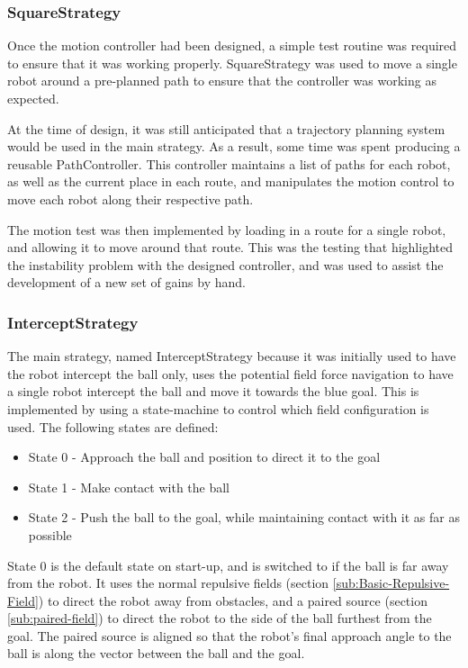 \documentclass[10pt]{article}
\begin{document}
\subsubsection{SquareStrategy}

Once the motion controller had been designed, a simple test routine was required
to ensure that it was working properly.  SquareStrategy was used to move a
single robot around a pre-planned path to ensure that the controller was working
as expected.

At the time of design, it was still anticipated that a trajectory planning
system would be used in the main strategy.  As a result, some time was spent
producing a reusable PathController.  This controller maintains a list of paths
for each robot, as well as the current place in each route, and manipulates the
motion control to move each robot along their respective path.

The motion test was then implemented by loading in a route for a single robot,
and allowing it to move around that route.  This was the testing that
highlighted the instability problem with the designed controller, and was used
to assist the development of a new set of gains by hand.

\subsubsection{InterceptStrategy}

The main strategy, named InterceptStrategy because it was initially used to have
the robot intercept the ball only, uses the potential field force navigation to
have a single robot intercept the ball and move it towards the blue goal.  This
is implemented by using a state-machine to control which field configuration is
used.  The following states are defined:

\begin{itemize}
  \item State 0 - Approach the ball and position to direct it to the goal
  \item State 1 - Make contact with the ball
  \item State 2 - Push the ball to the goal, while maintaining contact with it
  as far as possible
\end{itemize}

State 0 is the default state on start-up, and is switched to if the ball is far
away from the robot.  It uses the normal repulsive fields (section
\ref{sub:Basic-Repulsive-Field}) to direct the robot away from obstacles, and a
paired source (section \ref{sub:paired-field}) to direct the robot to the side
of the ball furthest from the goal.  The paired source is aligned so that the
robot's final approach angle to the ball is along the vector between the ball
and the goal.
\end{document}
